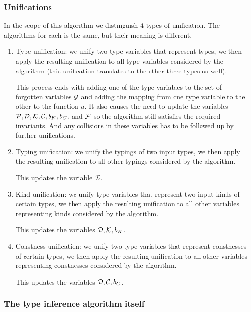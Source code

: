 \subsubsection{Unifications}

In the scope of this algorithm we distinguish 4 types of unification. The algorithms for each is the same, but their meaning is different.

\begin{enumerate}
    \item Type unification: we unify two type variables that represent types, we then apply the resulting unification to all type variables considered by the algorithm (this unification translates to the other three types as well). \label{tUni}

    This process ends with adding one of the type variables to the set of forgotten variables $\mathcal G$ and adding the mapping from one type variable to the other to the function $u$. It also causes the need to update the variables $\mathcal P, \mathcal D, \mathcal K, \mathcal C, b_K, b_C,$ and $\mathcal F$ so the algorithm still satisfies the required invariants. And any collisions in these variables has to be followed up by further unifications.

    \item Typing unification: we unify the typings of two input types, we then apply the resulting unification to all other typings considered by the algorithm.  \label{tyUni}

    This updates the variable $\mathcal D$.

    \item Kind unification: we unify type variables that represent two input kinds of certain types, we then apply the resulting unification to all other variables representing kinds considered by the algorithm. \label{kUni}

    This updates the variables $\mathcal D, \mathcal K, b_K$.

    \item Constness unification: we unify two type variables that represent constnesses of certain types, we then apply the resulting unification to all other variables representing constnesses considered by the algorithm. \label{cUni}

    This updates the variables $\mathcal D, \mathcal C, b_C$.
\end{enumerate}

\subsubsection{The type inference algorithm itself}

